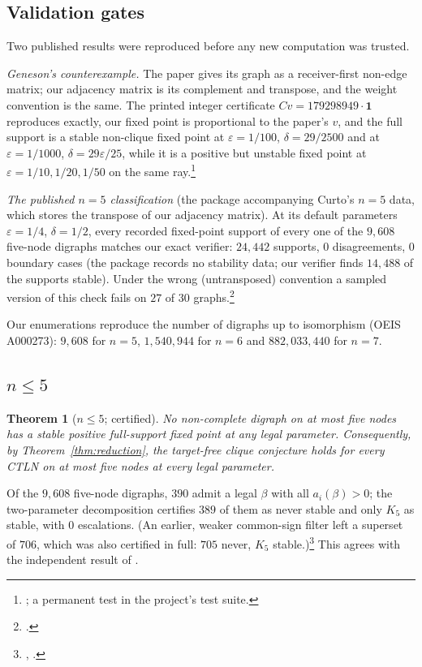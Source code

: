 \documentclass[11pt]{article}
\newtheorem{theorem}{Theorem}[section]
\theoremstyle{definition}
\newcommand{\one}{\mathbf{1}}
\newcommand{\eps}{\varepsilon}
\begin{document}
\subsection{Validation gates}
Two published results were reproduced before any new computation was trusted.

\emph{Geneson's counterexample.} The paper \cite{Geneson2026} gives its graph as a receiver-first non-edge matrix; our
adjacency matrix is its complement and transpose, and the weight convention is the same. The printed integer
certificate $Cv=179298949\cdot\one$ reproduces exactly, our fixed point is proportional to the paper's $v$, and the
full support is a stable non-clique fixed point at $\eps=1/100$, $\delta=29/2500$ and at $\eps=1/1000$,
$\delta=29\eps/25$, while it is a positive but unstable fixed point at $\eps=1/10,1/20,1/50$ on the same ray.\footnote{; a permanent test in the project's test suite.}

\emph{The published $n=5$ classification} (the package accompanying Curto's $n=5$ data, which stores the transpose of
our adjacency matrix). At its default parameters $\eps=1/4$, $\delta=1/2$, every recorded fixed-point support of every
one of the $9{,}608$ five-node digraphs matches our exact verifier: $24{,}442$ supports, $0$ disagreements, $0$ boundary
cases (the package records no stability data; our verifier finds $14{,}488$ of the supports stable). Under the wrong (untransposed) convention a sampled version of this check fails on
$27$ of $30$ graphs.\footnote{.}

Our enumerations reproduce the number of digraphs up to isomorphism (OEIS A000273): $9{,}608$ for $n=5$,
$1{,}540{,}944$ for $n=6$ and $882{,}033{,}440$ for $n=7$.

\subsection{\texorpdfstring{$n\le5$}{n <= 5}}
\begin{theorem}[$n\le5$; certified]\label{thm:n5}
No non-complete digraph on at most five nodes has a stable positive full-support fixed point at any legal parameter.
Consequently, by Theorem~\ref{thm:reduction}, the target-free clique conjecture holds for every CTLN on at most five
nodes at every legal parameter.
\end{theorem}
Of the $9{,}608$ five-node digraphs, $390$ admit a legal $\beta$ with all $a_i(\beta)>0$; the two-parameter
decomposition certifies $389$ of them as never stable and only $K_5$ as stable, with $0$ escalations. (An earlier,
weaker common-sign filter left a superset of $706$, which was also certified in full: $705$ never, $K_5$
stable.)\footnote{, .}
This agrees with the independent result of \cite{SixIsMinimal2026}.
\end{document}
